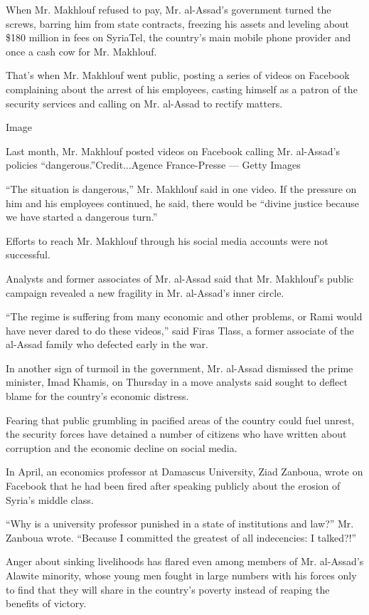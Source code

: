When Mr. Makhlouf refused to pay, Mr. al-Assad's government turned the
screws, barring him from state contracts, freezing his assets and
leveling about \$180 million in fees on SyriaTel, the country's main
mobile phone provider and once a cash cow for Mr. Makhlouf.

That's when Mr. Makhlouf went public, posting a series of videos on
Facebook complaining about the arrest of his employees, casting himself
as a patron of the security services and calling on Mr. al-Assad to
rectify matters.

Image

Last month, Mr. Makhlouf posted videos on Facebook calling Mr.
al-Assad's policies ``dangerous.''Credit...Agence France-Presse ---
Getty Images

``The situation is dangerous,'' Mr. Makhlouf said in one video. If the
pressure on him and his employees continued, he said, there would be
``divine justice because we have started a dangerous turn.''

Efforts to reach Mr. Makhlouf through his social media accounts were not
successful.

Analysts and former associates of Mr. al-Assad said that Mr. Makhlouf's
public campaign revealed a new fragility in Mr. al-Assad's inner circle.

``The regime is suffering from many economic and other problems, or Rami
would have never dared to do these videos,'' said Firas Tlass, a former
associate of the al-Assad family who defected early in the war.

In another sign of turmoil in the government, Mr. al-Assad dismissed the
prime minister, Imad Khamis, on Thursday in a move analysts said sought
to deflect blame for the country's economic distress.

Fearing that public grumbling in pacified areas of the country could
fuel unrest, the security forces have detained a number of citizens who
have written about corruption and the economic decline on social media.

In April, an economics professor at Damascus University, Ziad Zanboua,
wrote on Facebook that he had been fired after speaking publicly about
the erosion of Syria's middle class.

``Why is a university professor punished in a state of institutions and
law?'' Mr. Zanboua wrote. ``Because I committed the greatest of all
indecencies: I talked?!''

Anger about sinking livelihoods has flared even among members of Mr.
al-Assad's Alawite minority, whose young men fought in large numbers
with his forces only to find that they will share in the country's
poverty instead of reaping the benefits of victory.

